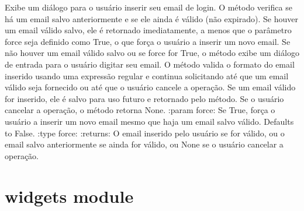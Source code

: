 \documentclass[letterpaper,10pt,english]{sphinxmanual}
\begin{document}
\begin{fulllineitems}
\label{\detokenize{api/user_login:user_login.prompt_email}}
\pysigstartsignatures
\pysiglinewithargsret
{}
{}
{}
\pysigstopsignatures
\sphinxAtStartPar
Exibe um diálogo para o usuário inserir seu e\sphinxhyphen{}mail de login. O método verifica se há um e\sphinxhyphen{}mail salvo anteriormente e se ele ainda é válido (não expirado). Se houver um e\sphinxhyphen{}mail válido salvo, ele é retornado imediatamente, a menos que o parâmetro force seja definido como True, o que força o usuário a inserir um novo e\sphinxhyphen{}mail. Se não houver um e\sphinxhyphen{}mail válido salvo ou se force for True, o método exibe um diálogo de entrada para o usuário digitar seu e\sphinxhyphen{}mail. O método valida o formato do e\sphinxhyphen{}mail inserido usando uma expressão regular e continua solicitando até que um e\sphinxhyphen{}mail válido seja fornecido ou até que o usuário cancele a operação. Se um e\sphinxhyphen{}mail válido for inserido, ele é salvo para uso futuro e retornado pelo método. Se o usuário cancelar a operação, o método retorna None.
:param force: Se True, força o usuário a inserir um novo e\sphinxhyphen{}mail mesmo que haja um e\sphinxhyphen{}mail salvo válido. Defaults to False.
:type force: 
:returns: O e\sphinxhyphen{}mail inserido pelo usuário se for válido, ou o e\sphinxhyphen{}mail salvo anteriormente se ainda for válido, ou None se o usuário cancelar a operação.
\begin{quote}\begin{description}
\sphinxAtStartPar
{}

\end{description}\end{quote}

\end{fulllineitems}


\sphinxstepscope


\section{widgets module}
\label{\detokenize{api/widgets:module-widgets}}\label{\detokenize{api/widgets:widgets-module}}\label{\detokenize{api/widgets::doc}}
\end{document}
